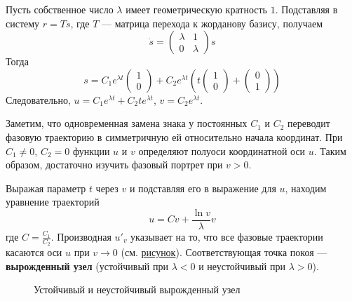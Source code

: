 Пусть собственное число $\lambda$ имеет геометрическую кратность $1$. Подставляя в систему $r = Ts$, где $T$ --- матрица перехода к жорданову базису, получаем
\begin{equation*}
    \dot{s} =
    \begin{pmatrix}
        \lambda & 1       \\
        0       & \lambda
    \end{pmatrix}
    s
\end{equation*}
Тогда
\begin{equation*}
    s = C_1e^{\lambda t}
    \begin{pmatrix}
        1 \\
        0
    \end{pmatrix}
    + C_2e^{\lambda t} (t
    \begin{pmatrix}
        1 \\
        0
    \end{pmatrix}
    +
    \begin{pmatrix}
        0 \\
        1
    \end{pmatrix}
    )
\end{equation*}
Следовательно, $u = C_1e^{\lambda t} + C_2te^{\lambda t}$, $v = C_2e^{\lambda t}$.

Заметим, что одновременная замена знака у постоянных $C_1$ и $C_2$ переводит фазовую траекторию в симметричную ей относительно начала координат. При $C_1 \neq 0$, $C_2 = 0$ функции $u$ и $v$ определяют полуоси координатной оси $u$. Таким образом, достаточно изучить фазовый портрет при $v > 0$.

Выражая параметр $t$ через $v$ и подставляя его в выражение для $u$, находим уравнение траекторий
\begin{equation*}
    u = Cv + \frac{\ln{v}}{\lambda}v
\end{equation*}
где $C = \frac{C_1}{C_2}$. Производная $u'_v$ указывает на то, что все фазовые траектории касаются оси $u$ при $v \to 0$ (см. \hyperref[virozhd]{рисунок}). Соответствующая точка покоя --- \textbf{вырожденный узел} (устойчивый при $\lambda < 0$ и неустойчивый при $\lambda > 0$).

\begin{figure}[H]\label{virozhd}
    \caption{Устойчивый и неустойчивый вырожденный узел}
\end{figure}

